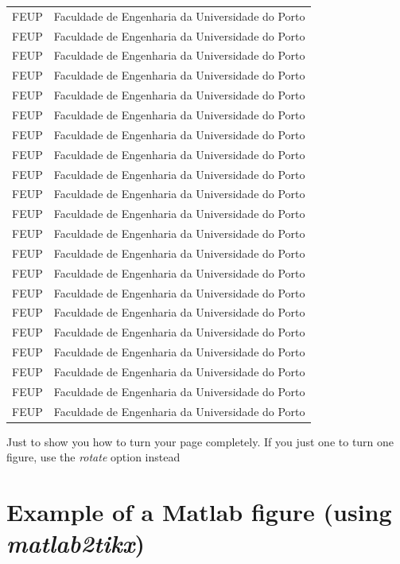 \begin{longtable}{lc}
		FEUP	&  Faculdade de Engenharia da Universidade do Porto\\
		FEUP	&  Faculdade de Engenharia da Universidade do Porto\\
		FEUP	&  Faculdade de Engenharia da Universidade do Porto\\
		FEUP	&  Faculdade de Engenharia da Universidade do Porto\\
		FEUP	&  Faculdade de Engenharia da Universidade do Porto\\
		FEUP	&  Faculdade de Engenharia da Universidade do Porto\\
		FEUP	&  Faculdade de Engenharia da Universidade do Porto\\
				FEUP	&  Faculdade de Engenharia da Universidade do Porto\\
		FEUP	&  Faculdade de Engenharia da Universidade do Porto\\
		FEUP	&  Faculdade de Engenharia da Universidade do Porto\\
		FEUP	&  Faculdade de Engenharia da Universidade do Porto\\
		FEUP	&  Faculdade de Engenharia da Universidade do Porto\\
		FEUP	&  Faculdade de Engenharia da Universidade do Porto\\
		FEUP	&  Faculdade de Engenharia da Universidade do Porto\\
		FEUP	&  Faculdade de Engenharia da Universidade do Porto\\
		FEUP	&  Faculdade de Engenharia da Universidade do Porto\\
		FEUP	&  Faculdade de Engenharia da Universidade do Porto\\
		FEUP	&  Faculdade de Engenharia da Universidade do Porto\\
		FEUP	&  Faculdade de Engenharia da Universidade do Porto\\
		FEUP	&  Faculdade de Engenharia da Universidade do Porto\\
		FEUP	&  Faculdade de Engenharia da Universidade do Porto\\
		\bottomrule
	\end{longtable}

\begin{landscape}

Just to show you how to turn your page completely.  If you just one to turn one figure, use the \emph{rotate} option instead

\end{landscape}


\section{Example of a Matlab figure (using \emph{matlab2tikx})}

